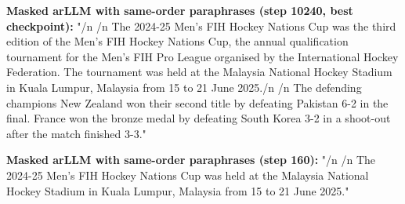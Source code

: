 {\textbf{Masked arLLM with same-order paraphrases (step 10240, best checkpoint):} "\slash n \slash n The 2024-25 Men's FIH Hockey Nations Cup was the third edition of the Men's FIH Hockey Nations Cup, the annual qualification tournament for the Men's FIH Pro League organised by the International Hockey Federation. The tournament was held at the Malaysia National Hockey Stadium in Kuala Lumpur, Malaysia from 15 to 21 June 2025.\slash n \slash n The defending champions New Zealand won their second title by defeating Pakistan 6-2 in the final. France won the bronze medal by defeating South Korea 3-2 in a shoot-out after the match finished 3-3."

\textbf{Masked arLLM with same-order paraphrases (step 160):} "\slash n \slash n The 2024-25 Men's FIH Hockey Nations Cup was held at the Malaysia National Hockey Stadium in Kuala Lumpur, Malaysia from 15 to 21 June 2025."
}